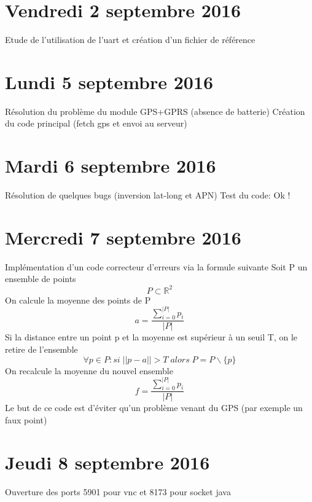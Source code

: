 \documentclass[a4paper,11pt]{article}
\begin{document}
\section{Vendredi 2 septembre 2016}
Etude de l'utilisation de l'uart et création d'un fichier de référence

\section{Lundi 5 septembre 2016}
Résolution du problème du module GPS+GPRS (absence de batterie) \newline
Création du code principal (fetch gps et envoi au serveur) \newline

\section{Mardi 6 septembre 2016}
Résolution de quelques bugs (inversion lat-long et APN) \newline
Test du code: Ok !

\section{Mercredi 7 septembre 2016}
Implémentation d'un code correcteur d'erreurs via la formule suivante
Soit P un ensemble de points
\begin{equation*}
P \subset \mathbb{R}^2
\end{equation*}
On calcule la moyenne des points de P
\begin{equation*}
a = \frac{\sum\limits_{i=0}^{|P|} p_i}{|P|}
\end{equation*}
Si la distance entre un point p et la moyenne est supérieur à un seuil T, on le retire de l'ensemble
\begin{equation*}
\forall p \in P : si\; ||p-a|| > T \; alors \; P = P\backslash\{p\}
\end{equation*}
On recalcule la moyenne du nouvel ensemble
\begin{equation*}
f = \frac{\sum\limits_{i=0}^{|P|} p_i}{|P|}
\end{equation*}
Le but de ce code est d'éviter qu'un problème venant du GPS (par exemple un faux point)

\section{Jeudi 8 septembre 2016}
Ouverture des ports 5901 pour vnc et 8173 pour socket java
\end{document}
